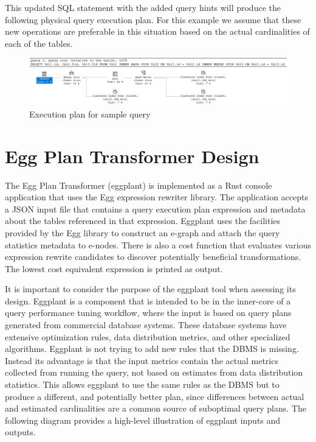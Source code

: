 \documentclass{article}
\begin{document}
This updated SQL statement with the added query hints will produce the following physical query execution plan.
For this example we assume that these new operations are preferable in this situation based on the
actual cardinalities of each of the tables.

\begin{figure}[H]
\centering
\begin{minipage}[b]{0.9\textwidth}
    \includegraphics[width=\textwidth]{sample_plan1.png}
    \caption{Execution plan for sample query}
\end{minipage}
\hfill
\end{figure}

\section*{Egg Plan Transformer Design}
The Egg Plan Transformer (eggplant) is implemented as a Rust console application that uses the Egg expression 
rewriter library.  The application accepts a JSON input file that contains a query execution plan expression 
and metadata about the tables referenced in that expression.  Eggplant uses the facilities provided by the
Egg library to construct an e-graph and attach the query statistics metadata to e-nodes.  There is also a cost function
that evaluates various expression rewrite candidates to discover potentially beneficial transformations.
The lowest cost equivalent expression is printed as output.

It is important to consider the purpose of the eggplant tool when assessing its design.  Eggplant is a component
that is intended to be in the inner-core of a query performance tuning workflow, where the input is based on
query plans generated from commercial database systems.  These database systems have extensive optimization 
rules, data distribution metrics, and other specialized algorithms.  Eggplant is not trying to add new rules
that the DBMS is missing.  Instead its advantage is that the input metrics contain the actual metrics collected
from running the query, not based on estimates from data distribution statistics.  This allows eggplant to use the same rules 
as the DBMS but to produce a different, and potentially better plan, since differences between actual and estimated
cardinalities are a common source of suboptimal query plans.  The following diagram provides a high-level illustration
of eggplant inputs and outputs.
\end{document}
